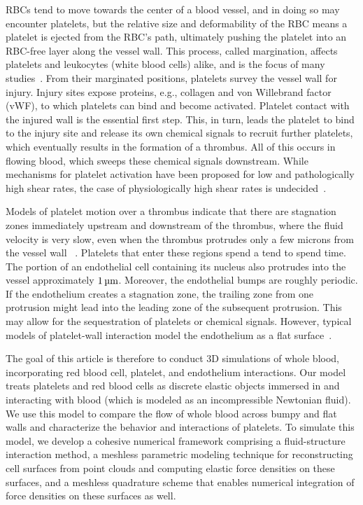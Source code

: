RBCs tend to move towards the center of a blood vessel, and in doing so may encounter
platelets, but the relative size and deformability of the RBC means a platelet is ejected
from the RBC's path, ultimately pushing the platelet into an RBC-free layer along the
vessel wall. This process, called margination, affects platelets and leukocytes (white
blood cells) alike, and is the focus of many studies~\cite{Freund:2007kx,Erickson:2010ep,
Erickson:2011cf,Zhao:2011do,Kumar:2011dd,Zhao:2012ggba,Fedosov:2012dy,Kumar:2012ie,
Fedosov:2013ul,Muller:2014is,Fedosov:2014bs, Vahidkhah:2014hy,Vahidkhah:2015ch,
Mehrabadi:2016fn}. From their marginated positions, platelets survey the vessel wall for
injury. Injury sites expose proteins, e.g., collagen and von Willebrand factor (vWF), to which
platelets can bind and become activated. Platelet contact with the injured wall is the
essential first step. This, in turn, leads the platelet to bind to the injury site and
release its own chemical signals to recruit further platelets, which eventually results
in the formation of a thrombus. All of this occurs in flowing blood, which sweeps these
chemical signals downstream. While mechanisms for platelet activation have been proposed
for low and pathologically high shear rates, the case of physiologically high shear rates
is undecided~\cite{Fogelson:2015fb}.

Models of platelet motion over a thrombus indicate that there are stagnation zones
immediately upstream and downstream of the thrombus, where the fluid velocity is very
slow, even when the thrombus protrudes only a few microns from the vessel wall~%
\cite{Skorczewski:2013jn,Wang:2013gs}. Platelets that enter these regions spend a
tend to spend time. The portion of an endothelial cell containing its nucleus also protrudes into
the vessel approximately $1\um$. Moreover, the endothelial bumps are roughly periodic. If
the endothelium creates a stagnation zone, the trailing zone from one protrusion might
lead into the leading zone of the subsequent protrusion. This may allow for the
sequestration of platelets or chemical signals. However, typical models of platelet-wall
interaction model the endothelium as a flat surface~\cite{Wu:2014gt,Vahidkhah:2015ch}.

The goal of this article is therefore to conduct 3D simulations of whole blood, incorporating
red blood cell, platelet, and endothelium interactions. Our model treats platelets and red blood cells
as discrete elastic objects immersed in and interacting with blood (which is modeled as an incompressible
Newtonian fluid). We use this model to compare the flow of
whole blood across bumpy and flat walls and characterize the behavior and interactions of platelets. To
simulate this model, we develop a cohesive numerical framework comprising a fluid-structure interaction method, a meshless parametric modeling technique for reconstructing cell
surfaces from point clouds and computing elastic force densities on these surfaces, and a meshless quadrature
scheme that enables numerical integration of force densities on these surfaces as well.

